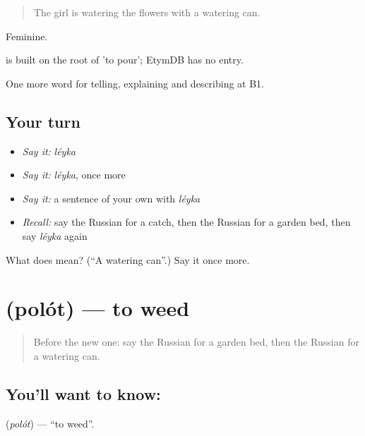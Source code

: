\begin{quote}
The girl is watering the flowers with a watering can.
\end{quote}

Feminine.

\begin{cousinweb}
\emph{} is built on the root of \emph{} 'to pour'; EtymDB has no entry.
\end{cousinweb}

\begin{grammarlens}[title={What you've built}]
One more word for telling, explaining and describing at B1.
\end{grammarlens}

\subsection*{Your turn}
\begin{itemize}
\raggedright
  \item \emph{Say it:} \emph{léyka}
  \item \emph{Say it:} \emph{léyka}, once more
  \item \emph{Say it:} a sentence of your own with \emph{léyka}
  \item \emph{Recall:} say the Russian for a catch, then the Russian for a garden bed, then say \emph{léyka} again
\end{itemize}

\begin{tcolorbox}[breakable,colback=teal!4,colframe=teal!35!black,title={Before you move on}]
What does  mean? (\textquotedblleft{}A watering can\textquotedblright{}.) Say it once more.
\end{tcolorbox}
\section[\texorpdfstring{\ru{полоть} (polót)}{полоть (polót)}]{ (polót) — to weed}

\label{lesson:RU-C506-polot}



\begin{quote}
Before the new one: say the Russian for a garden bed, then the Russian for a watering can.
\end{quote}

\subsection*{You'll want to know: }
\textbf{} (\emph{polót}) — \textquotedblleft{}to weed\textquotedblright{}.

